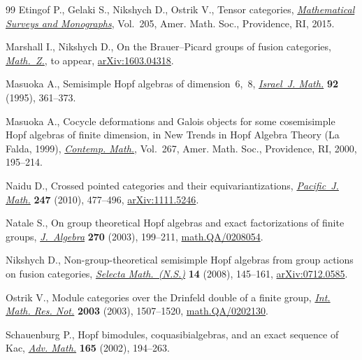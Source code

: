 \documentclass[11pt]{article}
\numberwithin{equation}{section}
\newcommand{\1}{\textbf{1}}
\begin{document}
\begin{thebibliography}{99}
Etingof P., Gelaki S., Nikshych D., Ostrik V., Tensor categories,
 \href{https://doi.org/10.1090/surv/205}{\textit{Mathematical Surveys and Monographs}}, Vol.~205, Amer. Math. Soc.,
 Providence, RI, 2015.

Marshall I., Nikshych D., On the {B}rauer--{P}icard groups of fusion
 categories, \href{https://doi.org/10.1007/s00209-017-1907-y}{\textit{Math.~Z.}}, {t}o appear, \href{https://arxiv.org/abs/1603.04318}{arXiv:1603.04318}.

Masuoka A., Semisimple {H}opf algebras of dimension~$6$,~$8$, \href{https://doi.org/10.1007/BF02762089}{\textit{Israel~J.
 Math.}} \textbf{92} (1995), 361--373.

Masuoka A., Cocycle deformations and {G}alois objects for some cosemisimple
 {H}opf algebras of f\/inite dimension, in New Trends in {H}opf Algebra Theory
 ({L}a {F}alda, 1999), \href{https://doi.org/10.1090/conm/267/04271}{\textit{Contemp. Math.}}, Vol.~267, Amer. Math. Soc.,
 Providence, RI, 2000, 195--214.

Naidu D., Crossed pointed categories and their equivariantizations,
 \href{https://doi.org/10.2140/pjm.2010.247.477}{\textit{Pacific~J. Math.}} \textbf{247} (2010), 477--496, \href{https://arxiv.org/abs/1111.5246}{arXiv:1111.5246}.

Natale S., On group theoretical {H}opf algebras and exact factorizations of
 f\/inite groups, \href{https://doi.org/10.1016/S0021-8693(03)00464-2}{\textit{J.~Algebra}} \textbf{270} (2003), 199--211,
 \href{https://arxiv.org/abs/math.QA/0208054}{math.QA/0208054}.

Nikshych D., Non-group-theoretical semisimple {H}opf algebras from group
 actions on fusion categories, \href{https://doi.org/10.1007/s00029-008-0060-1}{\textit{Selecta Math.~(N.S.)}} \textbf{14}
 (2008), 145--161, \href{https://arxiv.org/abs/0712.0585}{arXiv:0712.0585}.

Ostrik V., Module categories over the {D}rinfeld double of a f\/inite group,
 \href{https://doi.org/10.1155/S1073792803205079}{\textit{Int. Math. Res. Not.}} \textbf{2003} (2003), 1507--1520,
 \href{https://arxiv.org/abs/math.QA/0202130}{math.QA/0202130}.

Schauenburg P., Hopf bimodules, coquasibialgebras, and an exact sequence of
 {K}ac, \href{https://doi.org/10.1006/aima.2001.2016}{\textit{Adv. Math.}} \textbf{165} (2002), 194--263.

\end{thebibliography}
\end{document}
